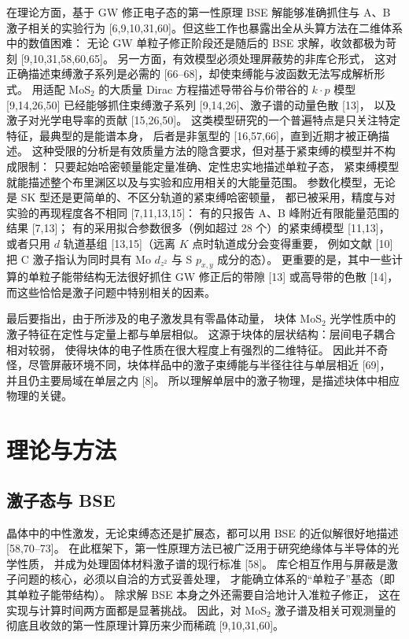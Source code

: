 \documentclass[11pt,a4paper]{ctexart}
\begin{document}
在理论方面，基于 GW 修正电子态的第一性原理 BSE 解能够准确抓住与 A、B 激子相关的实验行为
[6,9,10,31,60]。但这些工作也暴露出全从头算方法在二维体系中的数值困难：
无论 GW 单粒子修正阶段还是随后的 BSE 求解，收敛都极为苛刻 [9,10,31,58,60,65]。
另一方面，有效模型必须处理屏蔽势的非库仑形式，
这对正确描述束缚激子系列是必需的 [66--68]，却使束缚能与波函数无法写成解析形式。
用适配 MoS$_2$ 的大质量 Dirac 方程描述导带谷与价带谷的 $k\cdot p$ 模型 [9,14,26,50]
已经能够抓住束缚激子系列 [9,14,26]、激子谱的动量色散 [13]，
以及激子对光学电导率的贡献 [15,26,50]。
这类模型研究的一个普遍特点是只关注特定特征，最典型的是能谱本身，
后者是非氢型的 [16,57,66]，直到近期才被正确描述。
这种受限的分析是有效质量方法的隐含要求，但对基于紧束缚的模型并不构成限制：
只要起始哈密顿量能定量准确、定性忠实地描述单粒子态，
紧束缚模型就能描述整个布里渊区以及与实验和应用相关的大能量范围。
参数化模型，无论是 SK 型还是更简单的、不区分轨道的紧束缚哈密顿量，
都已被采用，精度与对实验的再现程度各不相同 [7,11,13,15]：
有的只报告 A、B 峰附近有限能量范围的结果 [7,13]；
有的采用拟合参数很多（例如超过 28 个）的紧束缚模型 [11,13]，
或者只用 $d$ 轨道基组 [13,15]（远离 $K$ 点时轨道成分会变得重要，
例如文献 [10] 把 C 激子指认为同时具有 Mo $d_{z^2}$ 与 S $p_{x,y}$ 成分的态）。
更重要的是，其中一些计算的单粒子能带结构无法很好抓住 GW 修正后的带隙 [13]
或高导带的色散 [14]，而这些恰恰是激子问题中特别相关的因素。

最后要指出，由于所涉及的电子激发具有零晶体动量，
块体 MoS$_2$ 光学性质中的激子特征在定性与定量上都与单层相似。
这源于块体的层状结构：层间电子耦合相对较弱，
使得块体的电子性质在很大程度上有强烈的二维特征。
因此并不奇怪，尽管屏蔽环境不同，块体样品中的激子束缚能与半径往往与单层相近 [69]，
并且仍主要局域在单层之内 [8]。
所以理解单层中的激子物理，是描述块体中相应物理的关键。

\section{理论与方法}
\subsection{激子态与 BSE}

晶体中的中性激发，无论束缚态还是扩展态，都可以用 BSE 的近似解很好地描述 [58,70--73]。
在此框架下，第一性原理方法已被广泛用于研究绝缘体与半导体的光学性质，
并成为处理固体材料激子谱的现行标准 [58]。
库仑相互作用与屏蔽是激子问题的核心，必须以自洽的方式妥善处理，
才能确立体系的“单粒子”基态（即其单粒子能带结构）。
除求解 BSE 本身之外还需要自洽地计入准粒子修正，
这在实现与计算时间两方面都是显著挑战。
因此，对 MoS$_2$ 激子谱及相关可观测量的彻底且收敛的第一性原理计算历来少而稀疏 [9,10,31,60]。
\end{document}

